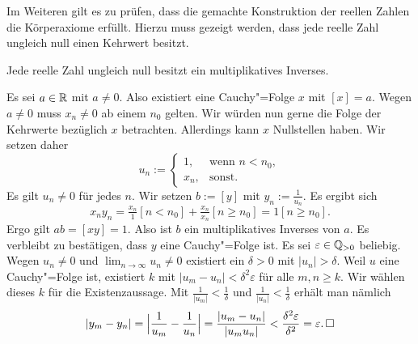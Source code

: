 \noindent
Im Weiteren gilt es zu prüfen, dass die gemachte Konstruktion der
reellen Zahlen die Körperaxiome erfüllt. Hierzu muss gezeigt werden,
dass jede reelle Zahl ungleich null einen Kehrwert besitzt.

\begin{Satz}
Jede reelle Zahl ungleich null besitzt ein multiplikatives Inverses.
\end{Satz}
\begin{Beweis}
Es sei $a\in\mathbb R$ mit $a\ne 0$. Also existiert eine Cauchy"=Folge $x$
mit $[x] = a$. Wegen $a\ne 0$ muss $x_n\ne 0$ ab einem $n_0$ gelten.
Wir würden nun gerne die Folge der Kehrwerte bezüglich $x$ betrachten.
Allerdings kann $x$ Nullstellen haben. Wir setzen daher
\[u_n := \begin{cases}
1, & \text{wenn $n<n_0$},\\
x_n, & \text{sonst}.
\end{cases}\]
Es gilt $u_n\ne 0$ für jedes $n$.
Wir setzen $b:=[y]$ mit $y_n := \tfrac{1}{u_n}$. Es ergibt sich
\[x_n y_n = \tfrac{x_n}{1}[n<n_0] + \tfrac{x_n}{x_n}[n\ge n_0]
= 1[n\ge n_0].\]
Ergo gilt $ab = [xy] = 1$. Also ist $b$ ein multiplikatives Inverses
von $a$. Es verbleibt zu bestätigen, dass $y$ eine Cauchy"=Folge ist.
Es sei $\varepsilon\in\mathbb Q_{>0}$ beliebig. Wegen $u_n\ne 0$ und
$\lim_{n\to\infty}u_n \ne 0$ existiert ein $\delta>0$ mit $|u_n|>\delta$.
Weil $u$ eine Cauchy"=Folge ist, existiert $k$ mit
$|u_m-u_n|<\delta^2\varepsilon$ für alle $m,n\ge k$. Wir wählen dieses
$k$ für die Existenzaussage. Mit $\frac{1}{|u_m|}<\frac{1}{\delta}$ und
$\frac{1}{|u_n|}<\frac{1}{\delta}$ erhält man nämlich
\[|y_m-y_n| = \Big|\frac{1}{u_m}-\frac{1}{u_n}\Big|
= \frac{|u_m-u_n|}{|u_m u_n|}
< \frac{\delta^2\varepsilon}{\delta^2} = \varepsilon.\,\Box\]
\end{Beweis}
